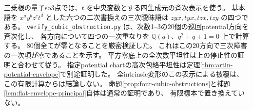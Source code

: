 \begin{remark}[一次の実行済み検証と残る条件]
三乗根の量子so3点では、$t$ を中央変数とする四生成元の斉次表示を使う。
基本語を $x^ay^bz^ct^d$ とした六つの二次書換えの三次曖昧語は
$zyx,tyx,tzx,tzy$ の四つである。
\texttt{verify\_cubic\_obstruction.py} は、次数1--3の20個の巡回potential方向を斉次化し、
各方向について四つの一次重なりを $\mathbb Q(q)$、$q^2+q+1=0$ 上で計算する。
80個全てが零となることを厳密検証した。
これはこの20方向で三次障害の一次項が零であることを示す。
平方零底上の全次数平坦性は上の停止性の証明と合わせて従う。
指定potential chartの高次包絡平坦性は定理\ref{thm:artin-potential-envelope}で別途証明した。
全intrinsic変形のこの表示による被覆は、
この有限計算からは結論しない。
命題\ref{prop:four-cubic-obstructions}と補題\ref{lem:flat-envelope-principal}自体は通常の証明であり、
有限標本で置き換えていない。
\end{remark}
